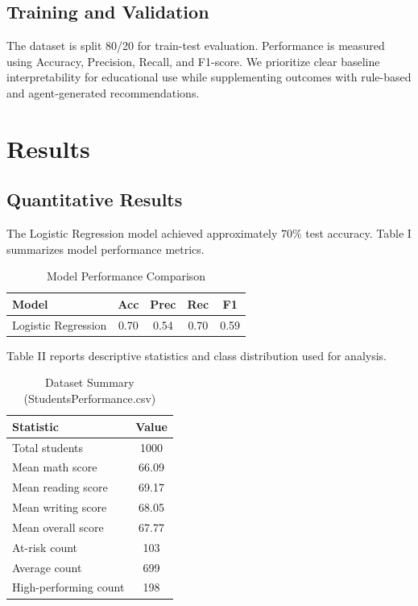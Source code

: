 \documentclass[conference]{IEEEtran}
\begin{document}
\subsection{Training and Validation}
The dataset is split 80/20 for train-test evaluation. Performance is measured using Accuracy, Precision, Recall, and F1-score. We prioritize clear baseline interpretability for educational use while supplementing outcomes with rule-based and agent-generated recommendations.

\section{Results}

\subsection{Quantitative Results}
The Logistic Regression model achieved approximately 70\% test accuracy. Table I summarizes model performance metrics.

\begin{table}[ht]
\centering
\caption{Model Performance Comparison}
\begin{tabular}{lcccc}
\toprule
Model & Acc & Prec & Rec & F1 \\
\midrule
Logistic Regression & 0.70 & 0.54 & 0.70 & 0.59 \\
\bottomrule
\end{tabular}
\end{table}

Table II reports descriptive statistics and class distribution used for analysis.

\begin{table}[ht]
\centering
\caption{Dataset Summary (StudentsPerformance.csv)}
\begin{tabular}{lc}
\toprule
Statistic & Value \\
\midrule
Total students & 1000 \\
Mean math score & 66.09 \\
Mean reading score & 69.17 \\
Mean writing score & 68.05 \\
Mean overall score & 67.77 \\
At-risk count & 103 \\
Average count & 699 \\
High-performing count & 198 \\
\bottomrule
\end{tabular}
\end{table}
\end{document}
